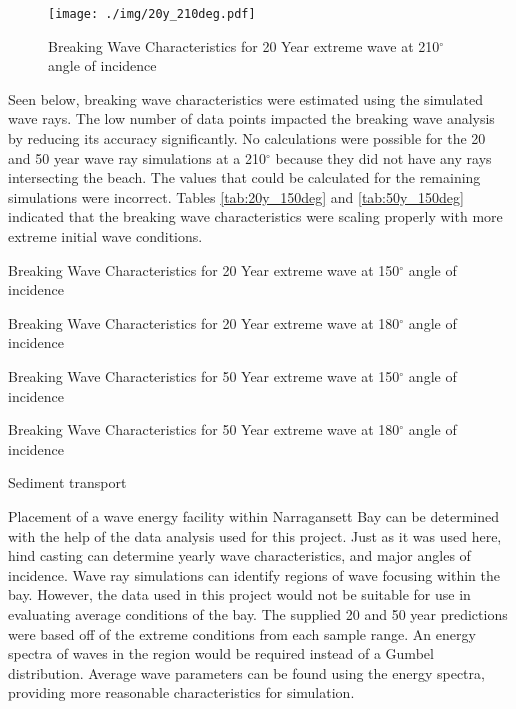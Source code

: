 \begin{figure}[H]
\centering
\texttt{[image: ./img/20y\_210deg.pdf]}
\caption{Breaking Wave Characteristics for 20 Year extreme wave at 210$^{\circ}$ angle of incidence}
\label{fig:20y210deg}
\end{figure}

Seen below, breaking wave characteristics were estimated using the simulated wave rays. The low number of data points impacted the breaking wave analysis by reducing its accuracy significantly. No calculations were possible for the 20 and 50 year wave ray simulations at a 210$^{\circ}$ because they did not have any rays intersecting the beach. The values that could be calculated for the remaining simulations were incorrect. Tables \ref{tab:20y_150deg} and \ref{tab:50y_150deg} indicated that the breaking wave characteristics were scaling properly with more extreme initial wave conditions.

\begin{table}[H]
\centering

\caption{Breaking Wave Characteristics for 20 Year extreme wave at 150$^{\circ}$ angle of incidence}
\label{tab:20y_150deg}
\end{table}

\begin{table}[H]
\centering

\caption{Breaking Wave Characteristics for 20 Year extreme wave at 180$^{\circ}$ angle of incidence}
\label{tab:20y_180deg}
\end{table}

\begin{table}[H]
\centering

\caption{Breaking Wave Characteristics for 50 Year extreme wave at 150$^{\circ}$ angle of incidence}
\label{tab:50y_150deg}
\end{table}

\begin{table}[H]
\centering

\caption{Breaking Wave Characteristics for 50 Year extreme wave at 180$^{\circ}$ angle of incidence}
\label{tab:50y_180deg}
\end{table}


Sediment transport 

Placement of a wave energy facility within Narragansett Bay can be determined with the help of the data analysis used for this project. Just as it was used here, hind casting can determine yearly wave characteristics, and major angles of incidence. Wave ray simulations can identify regions of wave focusing within the bay. However, the data used in this project would not be suitable for use in evaluating average conditions of the bay. The supplied 20 and 50 year predictions were based off of the extreme conditions from each sample range. An energy spectra of waves in the region would be required instead of a Gumbel distribution. Average wave parameters can be found using the energy spectra, providing more reasonable characteristics for simulation.


